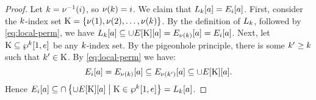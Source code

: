 \begin{proof}
Let $k = \nu^{-1}(i)$, so $\nu(k) = i$.
We claim that $L_{k}[a] = E_{i}[a]$.
First, consider the $k$-index set 
$\mathrm{K} = \left\{\nu(1), \nu(2), \dots, \nu(k)\right\}$.
By the definition of $L_{k}$, followed by \cref{eq:local-perm},
we have $L_{k}[a] \subseteq \cup E[\mathrm{K}][a] = 
E_{\nu(k)}[a] = E_{i}[a]$.
Next, let $\mathrm{K} \subseteq \wp^{k}{[}1,e]$ be any $k$-index set. By the
pigeonhole principle, there is some ${k'} \geq k$ such that ${k'} \in \mathrm{K}$.
By \cref{eq:local-perm} we have:
\[
  E_{i}[a] = E_{\nu(k)}[a] \subseteq 
  E_{\nu({k'})}[a] \subseteq \cup E[\mathrm{K}][a].
\]
Hence
$E_{i}[a] \subseteq \cap
\left\{\cup E[\mathrm{K}][a]\mathrel{}\middle|\mathrel{}\mathrm{K} \in \wp^{k}{[}1, e]\right\} =
L_{k}[a]$.
\end{proof}